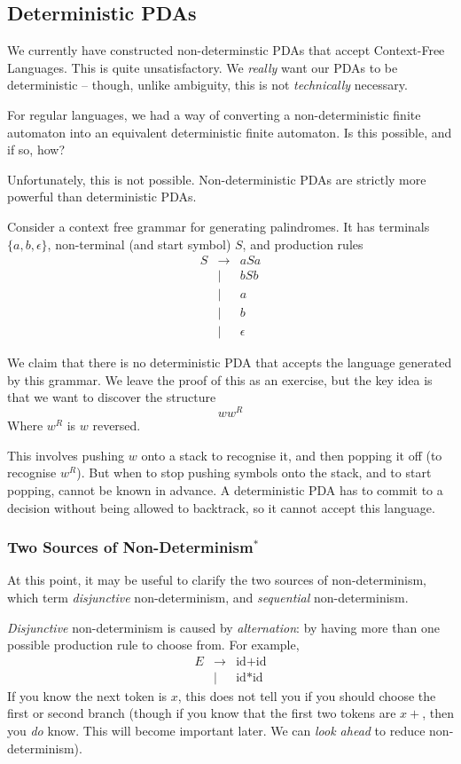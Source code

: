 \subsection{Deterministic PDAs}
We currently have constructed non-determinstic PDAs that accept Context-Free Languages. This is quite unsatisfactory. We \textit{really} want our PDAs to be deterministic -- though, unlike ambiguity, this is not \textit{technically} necessary.

For regular languages, we had a way of converting a non-deterministic finite automaton into an equivalent deterministic finite automaton. Is this possible, and if so, how?

Unfortunately, this is not possible. Non-deterministic PDAs are strictly more powerful than deterministic PDAs. 

Consider a context free grammar for generating palindromes. It has terminals $\{a, b, \epsilon \}$, non-terminal (and start symbol) $S$, and production rules
\[\begin{array}{rcl}
     S & \rightarrow & aSa  \\
     & \mid & bSb \\
     & \mid & a \\
     & \mid & b \\
     & \mid & \epsilon
\end{array}\]

We claim that there is no deterministic PDA that accepts the language generated by this grammar. We leave the proof of this as an exercise, but the key idea is that we want to discover the structure 
\[ w w^R\] 
Where $w^R$ is $w$ reversed.

This involves pushing $w$ onto a stack to recognise it, and then popping it off (to recognise $w^R$). But when to stop pushing symbols onto the stack, and to start popping, cannot be known in advance. A deterministic PDA has to commit to a decision without being allowed to backtrack, so it cannot accept this language. 

\subsubsection{Two Sources of Non-Determinism$^*$}
At this point, it may be useful to clarify the two sources of non-determinism, which \citet{krishnaswami-2019} term \textit{disjunctive} non-determinism, and \textit{sequential} non-determinism. 

\textit{Disjunctive} non-determinism is caused by \textit{alternation}: by having more than one possible production rule to choose from. For example, 
\[\begin{array}{rcl}
     E&\to&\text{id}+\text{id}  \\
      &\mid&\text{id}*\text{id}
\end{array}\]
If you know the next token is $x$, this does not tell you if you should choose the first or second branch (though if you know that the first two tokens are $x+$, then you \textit{do} know. This will become important later. We can \textit{look ahead} to reduce non-determinism).

